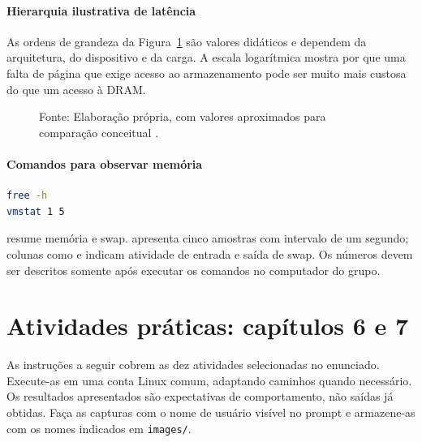 \documentclass[12pt,a4paper,oneside]{article}
\newcommand{\comando}[1]{\texttt{\detokenize{#1}}}
\newcommand{\fonte}[1]{\caption*{Fonte: #1}}
\begin{document}
\subsection{Hierarquia ilustrativa de latência}
As ordens de grandeza da Figura~\ref{fig:latencias} são valores didáticos e dependem da arquitetura, do dispositivo e da carga. A escala logarítmica mostra por que uma falta de página que exige acesso ao armazenamento pode ser muito mais custosa do que um acesso à DRAM.
\begin{figure}[htbp]\centering
{}
\caption{Ordens de grandeza ilustrativas de latência entre níveis de memória e armazenamento.}\label{fig:latencias}
\fonte{Elaboração própria, com valores aproximados para comparação conceitual \cite{patterson,arpaci}.}
\end{figure}
\subsection{Comandos para observar memória}
\begin{lstlisting}[language=bash,caption={Consulta de memória e swap},label={lst:memoria}]
free -h
vmstat 1 5
\end{lstlisting}
\comando{free -h} resume memória e swap. \comando{vmstat 1 5} apresenta cinco amostras com intervalo de um segundo; colunas como \comando{si} e \comando{so} indicam atividade de entrada e saída de swap. Os números devem ser descritos somente após executar os comandos no computador do grupo.

\part{Atividades práticas: capítulos 6 e 7}
As instruções a seguir cobrem as dez atividades selecionadas no enunciado. Execute-as em uma conta Linux comum, adaptando caminhos quando necessário. Os resultados apresentados são expectativas de comportamento, não saídas já obtidas. Faça as capturas com o nome de usuário visível no prompt e armazene-as com os nomes indicados em \texttt{images/}.
\end{document}
